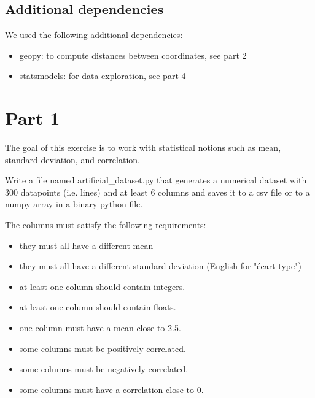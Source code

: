 \documentclass[10pt, a4paper]{article}
\begin{document}
\subsection*{Additional dependencies}

We used the following additional dependencies:

\begin{itemize}
    \item geopy: to compute distances between coordinates, see part 2
    \item statsmodels: for data exploration, see part 4
\end{itemize}

\newpage


\section*{Part 1}

\begin{Problem}
    The goal of this exercise is to work with statistical notions such as mean, standard deviation, and correlation.
    
    Write a file named artificial\_dataset.py that generates a numerical dataset with 300 datapoints (i.e. lines) and at least 6 columns and saves it to a csv file or to a numpy array in a binary python file.

    The columns must satisfy the following requirements:
    \begin{itemize}
        \item they must all have a different mean
        \item they must all have a different standard deviation (English for "écart type")
        \item at least one column should contain integers.
        \item at least one column should contain floats.
        \item one column must have a mean close to 2.5.
        \item some columns must be positively correlated.
        \item some columns must be negatively correlated.
        \item some columns must have a correlation close to 0.
    \end{itemize}
\end{Problem}
\end{document}

